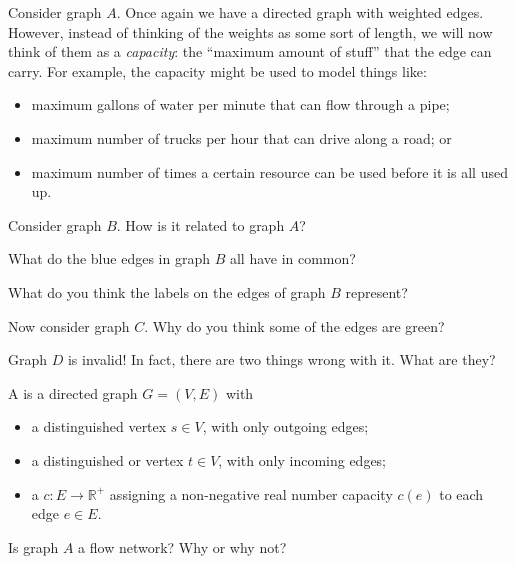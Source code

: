 \documentclass{tufte-handout}
\begin{document}
Consider graph $A$. Once again we have a directed graph with weighted
edges.  However, instead of thinking of the weights as some sort of
length, we will now think of them as a \emph{capacity}: the ``maximum
amount of stuff'' that the edge can carry.  For example, the capacity
might be used to model things like:
\begin{itemize}
\item maximum gallons of water per minute that can flow through a pipe;
\item maximum number of trucks per hour that can drive along a road; or
\item maximum number of times a certain resource can be used before it
  is all used up.
\end{itemize}

\begin{questions}
\item Consider graph $B$.  How is it related to graph $A$?
\item What do the blue edges in graph $B$ all have in common?
\item What do you think the labels on the edges of graph $B$
  represent?
\item Now consider graph $C$.  Why do you think some of the edges are
  green?
\item Graph $D$ is invalid!  In fact, there are two things wrong with
  it.  What are they?
\end{questions}

\newcommand{\R}{\mathbb{R}}

\pause
\begin{defn}
  A  is a directed graph $G = (V,E)$ with
  \begin{itemize}
  \item a distinguished  vertex $s \in V$, with only
    outgoing edges;
  \item a distinguished  or  vertex $t \in V$,
    with only incoming edges;
  \item a  $c : E \to \R^+$ assigning a
    non-negative real number capacity $c(e)$ to each edge $e \in E$.
  \end{itemize}
\end{defn}

\begin{questions}
  \item Is graph $A$ a flow network?  Why or why not?
\end{questions}
\end{document}
